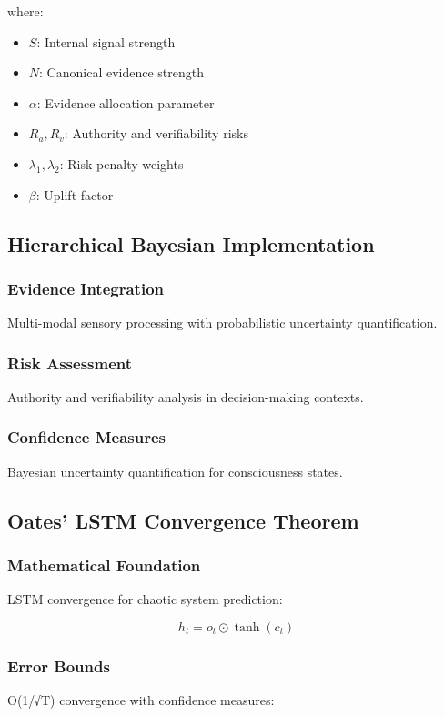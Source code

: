 \documentclass[11pt,a4paper]{article}
\begin{document}
where:
\begin{itemize}
    \item $S$: Internal signal strength
    \item $N$: Canonical evidence strength
    \item $\alpha$: Evidence allocation parameter
    \item $R_a, R_v$: Authority and verifiability risks
    \item $\lambda_1, \lambda_2$: Risk penalty weights
    \item $\beta$: Uplift factor
\end{itemize}

\subsection{Hierarchical Bayesian Implementation}

\subsubsection{Evidence Integration}
Multi-modal sensory processing with probabilistic uncertainty quantification.

\subsubsection{Risk Assessment}
Authority and verifiability analysis in decision-making contexts.

\subsubsection{Confidence Measures}
Bayesian uncertainty quantification for consciousness states.

\subsection{Oates' LSTM Convergence Theorem}

\subsubsection{Mathematical Foundation}
LSTM convergence for chaotic system prediction:

\begin{equation}
h_t = o_t \odot \tanh(c_t)
\label{eq:lstm_hidden}
\end{equation}

\subsubsection{Error Bounds}
O(1/√T) convergence with confidence measures:
\end{document}
